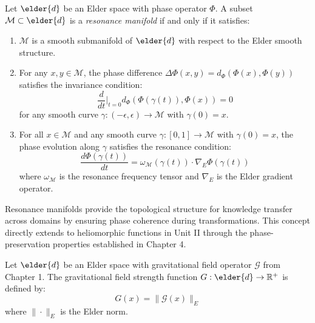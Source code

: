\begin{definition}
Let $\elder{d}$ be an Elder space with phase operator $\Phi$. A subset $\mathcal{M} \subset \elder{d}$ is a \textit{resonance manifold} if and only if it satisfies:
\begin{enumerate}
    \item $\mathcal{M}$ is a smooth submanifold of $\elder{d}$ with respect to the Elder smooth structure.
    
    \item For any $x, y \in \mathcal{M}$, the phase difference $\Delta\Phi(x, y) = d_{\Phi}(\Phi(x), \Phi(y))$ satisfies the invariance condition:
    \begin{equation}
    \frac{d}{dt}\Big|_{t=0} d_{\Phi}(\Phi(\gamma(t)), \Phi(x)) = 0
    \end{equation}
    for any smooth curve $\gamma: (-\epsilon, \epsilon) \rightarrow \mathcal{M}$ with $\gamma(0) = x$.
    
    \item For all $x \in \mathcal{M}$ and any smooth curve $\gamma: [0,1] \rightarrow \mathcal{M}$ with $\gamma(0) = x$, the phase evolution along $\gamma$ satisfies the resonance condition:
    \begin{equation}
    \frac{d\Phi(\gamma(t))}{dt} = \omega_{\mathcal{M}}(\gamma(t)) \cdot \nabla_E \Phi(\gamma(t))
    \end{equation}
    where $\omega_{\mathcal{M}}$ is the resonance frequency tensor and $\nabla_E$ is the Elder gradient operator.
\end{enumerate}
\end{definition}

\begin{remark}
Resonance manifolds provide the topological structure for knowledge transfer across domains by ensuring phase coherence during transformations. This concept directly extends to heliomorphic functions in Unit II through the phase-preservation properties established in Chapter 4.
\end{remark}

\begin{definition}
Let $\elder{d}$ be an Elder space with gravitational field operator $\mathcal{G}$ from Chapter 1. The gravitational field strength function $G: \elder{d} \rightarrow \mathbb{R}^+$ is defined by:
\begin{equation}
G(x) = \|\mathcal{G}(x)\|_E
\end{equation}
where $\|\cdot\|_E$ is the Elder norm.
\end{definition}

